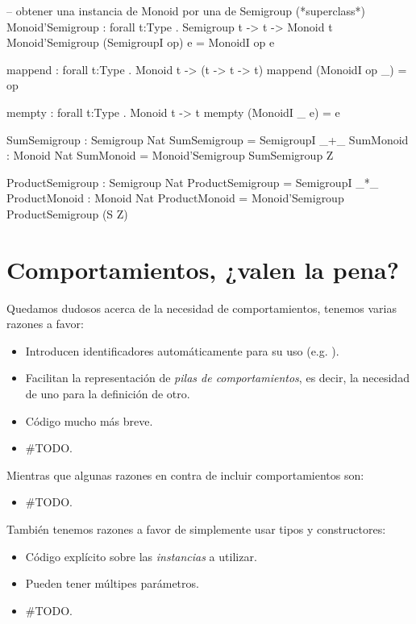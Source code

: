 {\begin{designfr}
\begin{anglercode}
-- obtener una instancia de Monoid por una de Semigroup (*superclass*)
Monoid'Semigroup : forall t:Type . Semigroup t -> t -> Monoid t
Monoid'Semigroup (SemigroupI op) e = MonoidI op e

mappend : forall t:Type . Monoid t -> (t -> t -> t)
mappend (MonoidI op _) = op

mempty : forall t:Type . Monoid t -> t
mempty (MonoidI _ e) = e

SumSemigroup : Semigroup Nat
SumSemigroup = SemigroupI _+_
SumMonoid : Monoid Nat
SumMonoid = Monoid'Semigroup SumSemigroup Z

ProductSemigroup : Semigroup Nat
ProductSemigroup = SemigroupI _*_
ProductMonoid : Monoid Nat
ProductMonoid = Monoid'Semigroup ProductSemigroup (S Z)
\end{anglercode}
\end{designfr}

\section{Comportamientos, ¿valen la pena?}

\begin{designfr}
Quedamos dudosos acerca de la necesidad de comportamientos, tenemos varias razones a favor:

\begin{itemize}
    \item Introducen identificadores automáticamente para su uso (e.g. ).
    \item Facilitan la representación de \emph{pilas de comportamientos}, es decir, la necesidad de uno para la definición de otro.
    \item Código mucho más breve.
    \item \#TODO.
\end{itemize}

Mientras que algunas razones en contra de incluir comportamientos son:

\begin{itemize}
    \item \#TODO.
\end{itemize}

También tenemos razones a favor de simplemente usar tipos y constructores:

\begin{itemize}
    \item Código explícito sobre las \emph{instancias} a utilizar.
    \item Pueden tener múltipes parámetros.
    \item \#TODO.
\end{itemize}


\end{designfr}}
